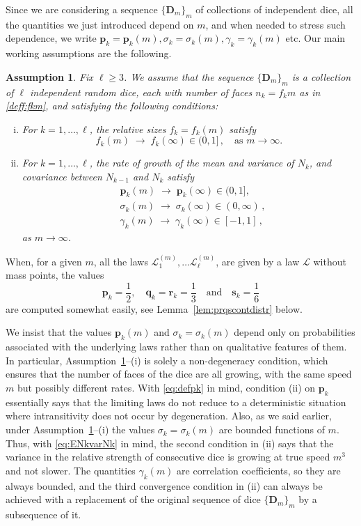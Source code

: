 \documentclass[reqno,a4paper,11pt]{amsart}
\newtheorem{assumption}[lemma]{Assumption}
\theoremstyle{remark}
\newcommand{\mc}[1]{{\mathcal #1}}
\newcommand{\mb}[1]{{\mathbf #1}}
\numberwithin{equation}{section}
\begin{document}
Since we are considering a sequence $\{\mb D_m\}_m$ of collections of independent dice, all the quantities we just introduced depend on $m$, and when needed to stress such dependence, we write $\mb p_k=\mb p_k(m), \sigma_k=\sigma_k(m),\gamma_k=\gamma_k(m)$ etc.
Our main working assumptions are the following.
%
\begin{assumption}\label{assumption:main}
Fix $\ell\geq 3$. We assume that the sequence $\{\mb D_m\}_m$ is a collection of $\ell$ independent random dice, each with number of faces $n_k=f_km$ as in \eqref{deff:fkm}, and satisfying the following  conditions:
%
\begin{enumerate}[(i)]
\item For $k=1,\hdots,\ell$, the relative sizes $f_k=f_k(m)$ satisfy
%
$$
f_k(m)\;\to\; f_k(\infty)\in (0,1]\,, \quad \text{as }m\to\infty.
$$

\item For $k=1,\hdots, \ell$, the rate of growth of the mean and variance of $N_k$, and covariance between $N_{k-1}$ and $N_k$ satisfy
%
\begin{align*}
& \mb p_k(m)\;\to\; \mb p_k(\infty)\in (0,1], \\
& \sigma_k(m)\;\to\; \sigma_k(\infty)\in (0,\infty)\,, \\
& \gamma_k(m)\;\to\; \gamma_k(\infty)\in [-1,1]\,,
\end{align*}
%
as $m\to\infty$.
\end{enumerate}
\end{assumption}

When, for a given $m$, all the laws $\mc L^{(m)}_1,\hdots \mc L^{(m)}_\ell$, are given by a law $\mc L$ without mass points, the values
%
$$
\mb p_k=\frac{1}{2},\quad \mb q_k=\mb r_k=\frac{1}{3} \quad \text{and}\quad \mb s_k=\frac{1}{6}
$$
%
are computed somewhat easily, see Lemma~\ref{lem:prqscontdistr} below.

We insist that the values $\mb p_k(m)$ and $\sigma_k=\sigma_k(m)$ depend only on probabilities associated with the underlying laws rather than on qualitative features of them. In particular, Assumption~\ref{assumption:main}--(i) is solely a non-degeneracy condition, which ensures that the number of faces of the dice are all growing, with the same speed $m$ but possibly different rates. With \eqref{eq:defpk} in mind, condition (ii) on $\mb p_k$ essentially says that the limiting laws do not reduce to a deterministic situation where intransitivity does not occur by degeneration. Also, as we said earlier, under Assumption~\ref{assumption:main}--(i) the values $\sigma_k=\sigma_k(m)$ are bounded functions of $m$. Thus, with \eqref{eq:ENkvarNk} in mind, the second condition in (ii) says that the variance in the relative strength of consecutive dice is growing at true speed $m^3$ and not slower. The quantities $\gamma_k(m)$ are correlation coefficients, so they are always bounded, and the third convergence condition in (ii) can always be achieved with a replacement of the original sequence of dice $\{\mb D_m\}_m$ by a subsequence of it.
\end{document}
